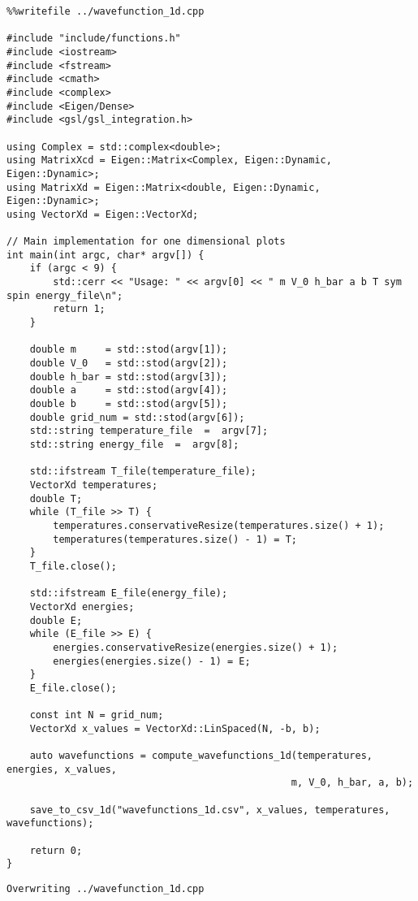 \documentclass[11pt]{article}
\begin{document}
\begin{verbatim}
%%writefile ../wavefunction_1d.cpp

#include "include/functions.h"
#include <iostream>
#include <fstream>
#include <cmath>
#include <complex>
#include <Eigen/Dense>
#include <gsl/gsl_integration.h>

using Complex = std::complex<double>;
using MatrixXcd = Eigen::Matrix<Complex, Eigen::Dynamic, Eigen::Dynamic>;
using MatrixXd = Eigen::Matrix<double, Eigen::Dynamic, Eigen::Dynamic>;
using VectorXd = Eigen::VectorXd;

// Main implementation for one dimensional plots
int main(int argc, char* argv[]) {
    if (argc < 9) {
        std::cerr << "Usage: " << argv[0] << " m V_0 h_bar a b T sym spin energy_file\n";
        return 1;
    }

    double m     = std::stod(argv[1]);
    double V_0   = std::stod(argv[2]);
    double h_bar = std::stod(argv[3]);
    double a     = std::stod(argv[4]);
    double b     = std::stod(argv[5]);
    double grid_num = std::stod(argv[6]);
    std::string temperature_file  =  argv[7];
    std::string energy_file  =  argv[8];

    std::ifstream T_file(temperature_file);
    VectorXd temperatures;
    double T;
    while (T_file >> T) {
        temperatures.conservativeResize(temperatures.size() + 1);
        temperatures(temperatures.size() - 1) = T;
    }
    T_file.close();

    std::ifstream E_file(energy_file);
    VectorXd energies;
    double E;
    while (E_file >> E) {
        energies.conservativeResize(energies.size() + 1);
        energies(energies.size() - 1) = E;
    }
    E_file.close();

    const int N = grid_num;
    VectorXd x_values = VectorXd::LinSpaced(N, -b, b);

    auto wavefunctions = compute_wavefunctions_1d(temperatures, energies, x_values,
                                                 m, V_0, h_bar, a, b);

    save_to_csv_1d("wavefunctions_1d.csv", x_values, temperatures, wavefunctions);

    return 0;
}
\end{verbatim}

\label{org84e936b}
\begin{verbatim}
Overwriting ../wavefunction_1d.cpp
\end{verbatim}
\end{document}
